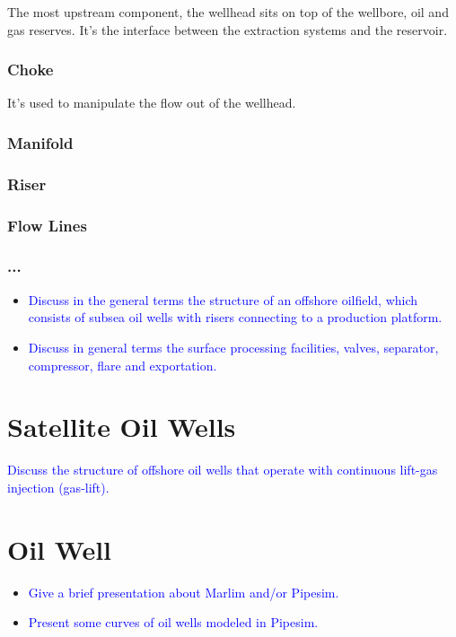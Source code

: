 The most upstream component, the wellhead sits on top of the wellbore, oil and gas reserves. It's the interface between the extraction systems and the reservoir.

\subsubsection{Choke}
It's used to manipulate the flow out of the wellhead.


\subsubsection{Manifold}



\subsubsection{Riser}



\subsubsection{Flow Lines}

\subsubsection{...}

\begin{itemize}

\item \textcolor{blue}{Discuss in the general terms the structure of an offshore oilfield, which consists of subsea oil wells with risers connecting to a production platform.}

\item \textcolor{blue}{Discuss in general terms the surface processing facilities, valves, separator, compressor, flare and exportation.}

\end{itemize}


\section{Satellite Oil Wells}

\textcolor{blue}{Discuss the structure of offshore oil wells that operate with continuous lift-gas injection (gas-lift).}



\section{Oil Well}


\begin{itemize}

\item \textcolor{blue}{Give a brief presentation about Marlim and/or Pipesim.}

\item \textcolor{blue}{Present some curves of oil wells modeled in Pipesim.}


\end{itemize}
